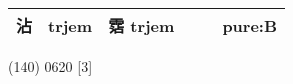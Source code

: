 \documentclass[14pt,a4paper]{scrartcl}
\begin{document}
\begin{longtable}[c]{@{}llllll@{}}
\begin{minipage}[t]{0.14\columnwidth}
沾
\strut\end{minipage} &
\begin{minipage}[t]{0.14\columnwidth}\raggedright\strut
trjem
\strut\end{minipage} &
\begin{minipage}[t]{0.14\columnwidth}\raggedright\strut
霑 trjem
\strut\end{minipage} &
\begin{minipage}[t]{0.14\columnwidth}\raggedright\strut
\strut\end{minipage} &
\begin{minipage}[t]{0.14\columnwidth}\raggedright\strut
\strut\end{minipage} &
\begin{minipage}[t]{0.14\columnwidth}\raggedright\strut
pure:B
\strut\end{minipage}\tabularnewline
\bottomrule
\end{longtable}

(140) 0620 {[}3{]}
\end{document}
